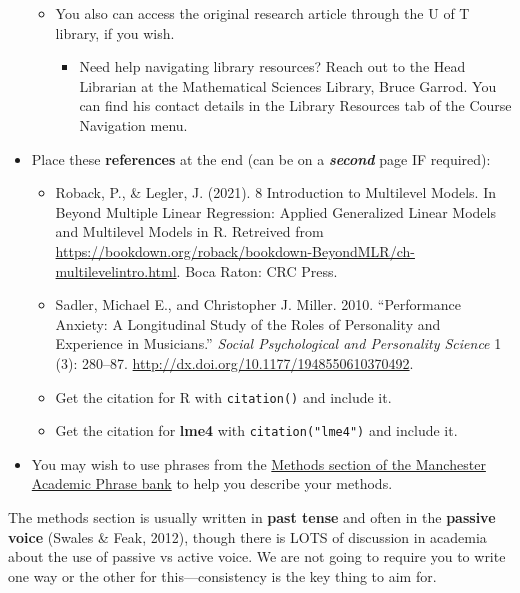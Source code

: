 \documentclass[
  openany]{book}
\providecommand{\tightlist}{%
  \setlength{\itemsep}{0pt}\setlength{\parskip}{0pt}}
\begin{document}
\begin{itemize}
  \begin{itemize}
  \item
    You also can access the original research article through the U of T library, if you wish.

    \begin{itemize}
    \tightlist
    \item
      Need help navigating library resources? Reach out to the Head Librarian at the Mathematical Sciences Library, Bruce Garrod. You can find his contact details in the Library Resources tab of the Course Navigation menu.
    \end{itemize}
  \end{itemize}
\item
  Place these \textbf{references} at the end (can be on a \textbf{\emph{second}} page IF required):

  \begin{itemize}
  \item
    Roback, P., \& Legler, J. (2021). 8 Introduction to Multilevel Models. In Beyond Multiple Linear Regression: Applied Generalized Linear Models and Multilevel Models in R. Retreived from \url{https://bookdown.org/roback/bookdown-BeyondMLR/ch-multilevelintro.html}. Boca Raton: CRC Press.
  \item
    Sadler, Michael E., and Christopher J. Miller. 2010. ``Performance Anxiety: A Longitudinal Study of the Roles of Personality and Experience in Musicians.'' \emph{Social Psychological and Personality Science} 1 (3): 280--87. \url{http://dx.doi.org/10.1177/1948550610370492}.
  \item
    Get the citation for R with \texttt{citation()} and include it.
  \item
    Get the citation for \textbf{lme4} with \texttt{citation("lme4")} and include it.
  \end{itemize}
\item
  You may wish to use phrases from the \href{https://www.phrasebank.manchester.ac.uk/describing-methods/}{Methods section of the Manchester Academic Phrase bank} to help you describe your methods.
\end{itemize}

The methods section is usually written in \textbf{past tense} and often in the \textbf{passive voice} (Swales \& Feak, 2012), though there is LOTS of discussion in academia about the use of passive vs active voice. We are not going to require you to write one way or the other for this---consistency is the key thing to aim for.
\end{document}
